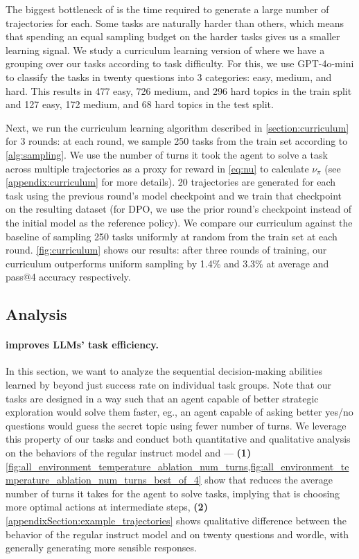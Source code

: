 The biggest bottleneck of \ours{} is the time required to generate a large number of trajectories for each. 
Some tasks are naturally harder than others, which means that spending an equal sampling budget on the harder tasks gives us a smaller learning signal. 
We study a curriculum learning version of \ours{} where we have a grouping over our tasks according to task difficulty. For this, we use GPT-4o-mini to classify the tasks in twenty questions into 3 categories: easy, medium, and hard. This results in 477 easy, 726 medium, and 296 hard topics in the train split and 127 easy, 172 medium, and 68 hard topics in the test split. 

Next, we run the curriculum learning algorithm described in \cref{section:curriculum} for 3 rounds: at each round, we sample 250 tasks from the train set according to \cref{alg:sampling}. We use the number of turns it took the agent to solve a task across multiple trajectories as a proxy for reward in \cref{eq:nu} to calculate $\nu_{\pi}$ (see \cref{appendix:curriculum} for more details). 20 trajectories are generated for each task using the previous round's model checkpoint and we train that checkpoint on the resulting dataset (for DPO, we use the prior round's checkpoint instead of the initial model as the reference policy). We compare our curriculum against the baseline of sampling 250 tasks uniformly at random from the train set at each round. \cref{fig:curriculum} shows our results: after three rounds of training, our curriculum outperforms uniform sampling by 1.4\% and 3.3\% at average and pass@4 accuracy respectively.


\subsection{Analysis}


\paragraph{\ours{} improves LLMs' task efficiency.} In this section, we want to analyze the sequential decision-making abilities learned by \ours{} beyond just success rate on individual task groups. Note that our tasks are designed in a way such that an agent capable of better strategic exploration would solve them faster, eg., an agent capable of asking better yes/no questions would guess the secret topic using fewer number of turns. We leverage this property of our tasks and conduct both quantitative and qualitative analysis on the behaviors of the regular instruct model and \ours{} --- \textbf{(1)} \cref{fig:all_environment_temperature_ablation_num_turns,fig:all_environment_temperature_ablation_num_turns_best_of_4} show that \ours{} reduces the average number of turns it takes for the agent to solve tasks, implying that \ours{} is choosing more optimal actions at intermediate steps,  \textbf{(2)} \cref{appendixSection:example_trajectories} shows qualitative difference between the behavior of the regular instruct model and \ours{} on twenty questions and wordle, with \ours{} generally generating more sensible responses.

